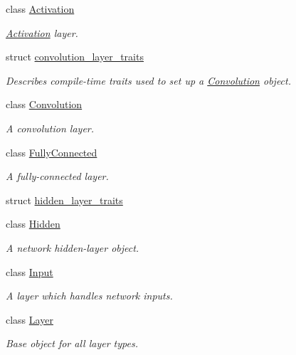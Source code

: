 \begin{DoxyCompactItemize}
\item 
class \hyperlink{classffnn_1_1layer_1_1_activation}{Activation}
\begin{DoxyCompactList}\small\item\em \hyperlink{classffnn_1_1layer_1_1_activation}{Activation} layer. \end{DoxyCompactList}\item 
struct \hyperlink{structffnn_1_1layer_1_1convolution__layer__traits}{convolution\-\_\-layer\-\_\-traits}
\begin{DoxyCompactList}\small\item\em Describes compile-\/time traits used to set up a \hyperlink{classffnn_1_1layer_1_1_convolution}{Convolution} object. \end{DoxyCompactList}\item 
class \hyperlink{classffnn_1_1layer_1_1_convolution}{Convolution}
\begin{DoxyCompactList}\small\item\em A convolution layer. \end{DoxyCompactList}\item 
class \hyperlink{classffnn_1_1layer_1_1_fully_connected}{Fully\-Connected}
\begin{DoxyCompactList}\small\item\em A fully-\/connected layer. \end{DoxyCompactList}\item 
struct \hyperlink{structffnn_1_1layer_1_1hidden__layer__traits}{hidden\-\_\-layer\-\_\-traits}
\item 
class \hyperlink{classffnn_1_1layer_1_1_hidden}{Hidden}
\begin{DoxyCompactList}\small\item\em A network hidden-\/layer object. \end{DoxyCompactList}\item 
class \hyperlink{classffnn_1_1layer_1_1_input}{Input}
\begin{DoxyCompactList}\small\item\em A layer which handles network inputs. \end{DoxyCompactList}\item 
class \hyperlink{classffnn_1_1layer_1_1_layer}{Layer}
\begin{DoxyCompactList}\small\item\em Base object for all layer types. \end{DoxyCompactList}\item 

\end{DoxyCompactItemize}
